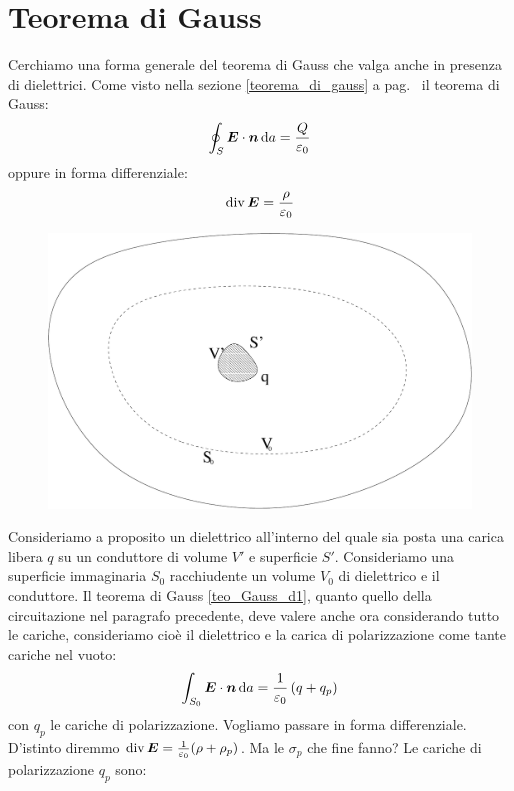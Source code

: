 \section{Teorema di Gauss}
Cerchiamo una forma generale del teorema di Gauss che valga anche in presenza di dielettrici. Come visto nella sezione \ref{teorema_di_gauss} a pag.~\pageref{teorema_di_gauss} il teorema di Gauss:
\begin{equation}
  \oint_S\boldsymbol{E}\cdot\boldsymbol{n}\,\mathrm{d} a=\frac{Q}{\varepsilon_0}
  \label{teo_Gauss_d1}
\end{equation}
oppure in forma differenziale:
\begin{equation}
  \operatorname{div} \boldsymbol{E}=\frac{\rho}{\varepsilon_0}
\end{equation}
\begin{figure}[htbp]
  \centering
  \includegraphics[scale=0.35]{immagini/fisica2/gauss_dielettrici}
\end{figure}
Consideriamo a proposito un dielettrico all'interno del quale sia posta una carica libera $q$ su un conduttore di volume $V'$ e superficie $S'$. Consideriamo una superficie immaginaria $S_0$ racchiudente un volume $V_0$ di dielettrico e il conduttore. Il teorema di Gauss \eqref{teo_Gauss_d1}, quanto quello della circuitazione nel paragrafo precedente, deve valere anche ora considerando tutto le cariche, consideriamo cioè il dielettrico e la carica di polarizzazione come tante cariche nel vuoto:
\begin{equation}
  \int_{S_0}\boldsymbol{E}\cdot\boldsymbol{n}\,\mathrm{d} a=\frac{1}{\varepsilon_0}\left(q+q_p\right)
  \label{gauss_dielettrici_3}
\end{equation}
con $q_p$ le cariche di polarizzazione. Vogliamo passare in forma differenziale. D'istinto diremmo $\operatorname{div}\boldsymbol{E}=\frac{1}{\varepsilon_0}(\rho+\rho_p)$. Ma le $\sigma_p$ che fine fanno? Le cariche di polarizzazione $q_p$ sono:
